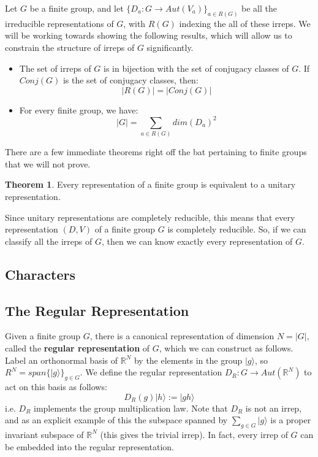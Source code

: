 \documentclass[11pt, oneside]{article}   	%
\theoremstyle{definition}
\newtheorem{theorem}{Theorem}[section]
\begin{document}
Let $G$ be a finite group, and let $\{D_a : G\rightarrow Aut(V_a)\}_{a\in R(G)}$ be all the irreducible representations of $G$, 
with $R(G)$ indexing the all of these irreps. We will be working towards showing the following results, which will allow us to 
constrain the structure of irreps of $G$ significantly.
 \begin{itemize}
 	\item The set of irreps of $G$ is in bijection with the set of conjugacy classes of $G$. If $Conj(G)$ is the set of conjugacy 
	classes, then:
	\begin{equation}
		|R(G)| = |Conj(G)|
	\end{equation}
	\item For every finite group, we have:
	\begin{equation}
		|G| = \sum_{a\in R(G)} dim(D_a)^2
	\end{equation}
 \end{itemize}

There are a few immediate theorems right off the bat pertaining to finite groups that we will not prove.
\begin{theorem}
	Every representation of a finite group is equivalent to a unitary representation.
\end{theorem}
Since unitary representations are completely reducible, this means that every representation $(D, V)$ of a finite group $G$ is 
completely reducible. So, if we can classify all the irreps of $G$, then we can know exactly every representation of $G$. 

\subsection{Characters}

\subsection{The Regular Representation}

Given a finite group $G$, there is a canonical representation of dimension $N = |G|$, called the \textbf{regular representation} 
of $G$, which we can construct as follows. Label an orthonormal basis of $\mathbb R^N$ by the elements in the group 
$|g\rangle$, so $R^N = span\{|g\rangle\}_{g\in G}$. We define the regular representation $D_R : G\rightarrow 
Aut(\mathbb R^N)$ to act on this basis as follows: 
\begin{equation}
	D_R(g)|h\rangle := |gh\rangle
\end{equation}
i.e. $D_R$ implements the group multiplication law. Note that $D_R$ is not an irrep, and as an explicit example of this 
the subspace spanned by $\sum_{g\in G}|g\rangle$ is a proper invariant subspace of $\mathbb R^N$ (this gives the 
trivial irrep). In fact, every irrep of $G$ can be embedded into the regular representation. 
\end{document}
